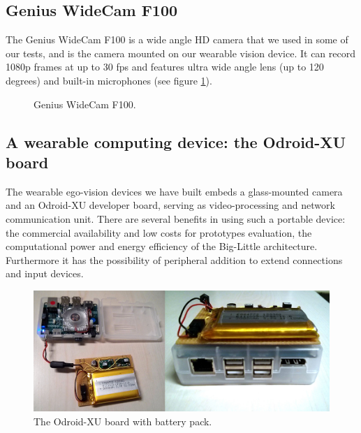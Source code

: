 \subsection{Genius WideCam F100}
The Genius WideCam F100 is a wide angle HD camera that we used in some of our tests, and is the camera mounted on our wearable vision device. It can record 1080p frames at up to 30 fps and features ultra wide angle lens (up to 120 degrees) and built-in microphones (see figure \ref{fig:wide-camera}).

\begin{figure}[tb]
\centering
{}
\caption{Genius WideCam F100.}
\label{fig:wide-camera}
\end{figure}

\subsection{A wearable computing device: the Odroid-XU board}
\label{odroid-intro}


The wearable ego-vision devices we have built embeds a glass-mounted camera and an Odroid-XU developer board, serving as video-processing and network communication unit.
There are several benefits in using such a portable device: the commercial availability and low costs for prototypes evaluation, the computational power and energy efficiency of the Big-Little architecture. Furthermore it has the possibility  of peripheral addition to extend connections and input devices. 

\begin{figure}[t!]
\centering
\includegraphics[width=0.6\linewidth]{Figures/board.jpg}
\caption{The Odroid-XU board with battery pack.}
\label{board}
\end{figure}

